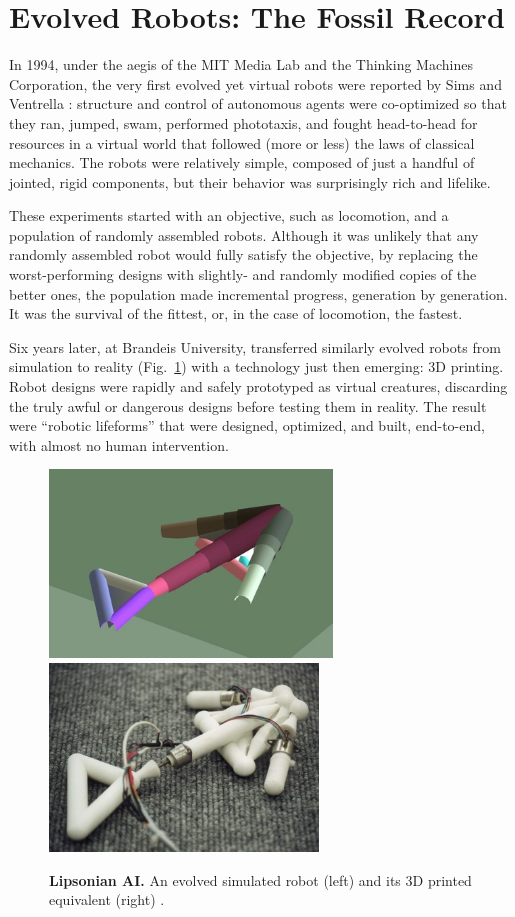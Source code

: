 \section{Evolved Robots: The Fossil Record}


In 1994,
under the aegis of the MIT Media Lab and the Thinking Machines Corporation,
the very first evolved yet virtual robots were reported by Sims \cite{sims1994evolving,sims1994comp} and Ventrella \cite{ventrella1994explorations}: structure and control of autonomous agents were co-optimized so that they ran, jumped, swam, performed phototaxis, and fought head-to-head for resources in a virtual world that followed (more or less) the laws of classical mechanics. 
The robots were relatively simple, composed of just a handful of jointed, rigid components, but their behavior was surprisingly rich and lifelike.

These experiments started with an objective, such as locomotion, and a population of randomly assembled robots. 
Although it was unlikely that any randomly assembled robot would fully satisfy the objective, by replacing the worst-performing designs with slightly- and randomly modified copies of the better ones, the population made incremental progress, generation by generation. 
It was the survival of the fittest, or, in the case of locomotion, the fastest.

Six years later, 
at Brandeis University, \citet{lipson2000automatic} transferred similarly evolved robots from simulation to reality (Fig.~\ref{fig:lipson}) with a technology just then emerging: 3D printing. Robot designs were rapidly and safely prototyped as virtual creatures, discarding the truly awful or dangerous designs before testing them in reality. 
The result were ``robotic lifeforms'' that were designed, optimized, and built, end-to-end, with almost no human intervention. 


\begin{figure}
\centering
\includegraphics[height=5cm]{fig/arrow-hires1.jpg}
\includegraphics[height=5cm]{fig/arrow-hires2.jpg}
\caption{\label{fig:lipson}%
\textbf{Lipsonian AI.}
An evolved simulated robot (left) and its 3D printed equivalent (right) \cite{lipson2000automatic}.
}
\end{figure}

